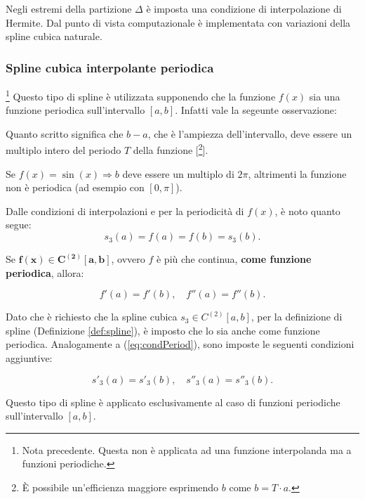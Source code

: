Negli estremi della partizione $\Delta$ è imposta una condizione di interpolazione di Hermite.
Dal punto di vista computazionale è implementata con variazioni della spline cubica naturale.

\subsubsection{Spline cubica interpolante periodica} \footnote{Nota precedente. Questa non è applicata ad una funzione interpolanda ma a funzioni periodiche.}
Questo tipo di spline è utilizzata supponendo che la funzione $f(x)$ sia una funzione periodica sull'intervallo $[a,b]$. Infatti vale la segeunte osservazione:

\begin{remark}
    Quanto scritto significa che $b-a$, che è l'ampiezza dell'intervallo, deve essere un multiplo intero del periodo $T$ della funzione [\footnote{È possibile un'efficienza maggiore esprimendo $b$ come $b=T\cdot a$.}].
\end{remark}

\begin{example}
    Se $f(x)=\sin(x)\Rightarrow b$ deve essere un multiplo di $2\pi$, altrimenti la funzione non è periodica (ad esempio con $[0,\pi]$).
\end{example}

Dalle condizioni di interpolazioni e per la periodicità di $f(x)$, è noto quanto segue:
\begin{equation*}
    s_3(a)=f(a)=f(b)=s_3(b).
\end{equation*}

Se $\boldsymbol{f(x)\in C^{(2)}[a,b]}$, ovvero $f$ è più che continua, \textbf{come funzione periodica}, allora:

\begin{equation}\label{eq:condPeriod}
    f'(a)=f'(b),\quad f''(a)=f''(b).
\end{equation}

Dato che è richiesto che la spline cubica $s_3\in C^{(2)}[a,b]$, per la definizione di spline (Definizione \ref{def:spline}), è imposto che lo sia anche come funzione periodica. Analogamente a (\ref{eq:condPeriod}), sono imposte le seguenti condizioni aggiuntive:

\begin{equation}\label{eq:condSplineCubPer}
    \boxed{s'_3(a)=s'_3(b),\quad s''_3(a)=s''_3(b).}
\end{equation}

\begin{remark}
    Questo tipo di spline è applicato esclusivamente al caso di funzioni periodiche sull'intervallo $[a,b]$.
\end{remark}

